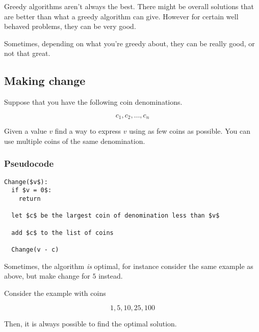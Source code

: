 \documentclass[12pt]{article}
\begin{document}
  Greedy algorithms aren't always the best. There might be overall solutions that
  are better than what a greedy algorithm can give. However for certain well
  behaved problems, they can be very good.

  Sometimes, depending on what you're greedy about, they can be really good, or
  not that great.

  \subsection{Making change}

  Suppose that you have the following coin denominations.

  \[
    c_1, c_2, \dots, c_n
  \]

  Given a value $v$ find a way to express $v$ using as few coins as possible. You
  can use multiple coins of the same denomination.

  \subsubsection{Pseudocode}

  \begin{lstlisting}
Change($v$):
  if $v = 0$:
    return

  let $c$ be the largest coin of denomination less than $v$

  add $c$ to the list of coins

  Change(v - c)
  \end{lstlisting}

  

  Sometimes, the algorithm {\it is} optimal, for instance consider the same
  example as above, but make change for $5$ instead.


  Consider the example with coins

  \[
    1, 5, 10, 25, 100
  \]

  Then, it is always possible to find the optimal solution.

\end{document}
